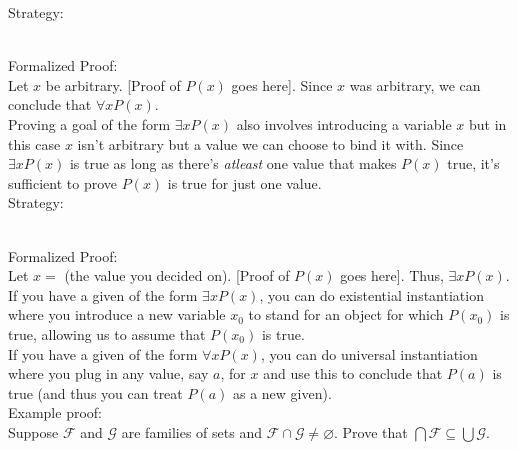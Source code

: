 \documentclass{article}
\begin{document}
\noindent Strategy:\\
\\
Formalized Proof:\\
Let $x$ be arbitrary. [Proof of $P(x)$ goes here]. Since $x$ was arbitrary, we can conclude that $\forall xP(x)$.\\

\noindent Proving a goal of the form $\exists xP(x)$ also involves introducing a variable $x$ but in this case $x$ isn't arbitrary but a value we can choose to bind it with. Since $\exists xP(x)$ is true as long as there's \textit{atleast} one value that makes $P(x)$ true, it's sufficient to prove $P(x)$ is true for just one value.\\

\noindent Strategy:\\
\\
Formalized Proof:\\
Let $x = $ (the value you decided on). [Proof of $P(x)$ goes here]. Thus, $\exists xP(x)$.\\

\noindent If you have a given of the form $\exists xP(x)$, you can do \gls{existential instantiation} where you introduce a new variable $x_0$ to stand for an object for which $P(x_0)$ is true, allowing us to assume that $P(x_0)$ is true.\\

\noindent If you have a given of the form $\forall xP(x)$, you can do \gls{universal instantiation} where you plug in any value, say $a$, for $x$ and use this to conclude that $P(a)$ is true (and thus you can treat $P(a)$ as a new given).\\

\noindent Example proof:\\
Suppose $\mathcal{F}$ and $\mathcal{G}$ are families of sets and $\mathcal{F} \cap \mathcal{G} \neq \varnothing$. Prove that $\bigcap \mathcal{F} \subseteq \bigcup \mathcal{G}$. 
\end{document}
